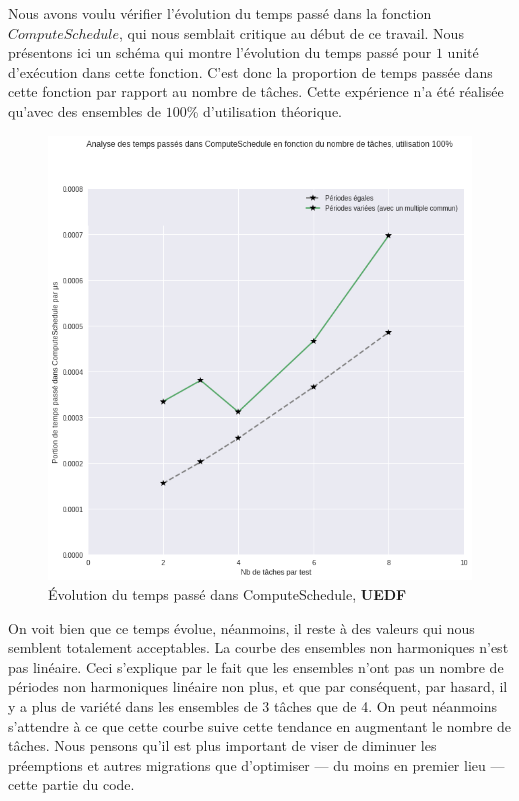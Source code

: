 	Nous avons voulu vérifier l'évolution du temps passé dans la fonction $ComputeSchedule$, qui nous semblait critique 
	au début de ce travail. Nous présentons ici un schéma qui montre 
	l'évolution du temps passé pour $1$ unité d'exécution dans cette fonction. C'est donc la 
	proportion de temps passée dans cette fonction par rapport au nombre de tâches. \newline
	Cette expérience n'a été réalisée qu'avec des ensembles de $100$\% d'utilisation théorique.

	\begin{figure}[H]
	\label{timeevolution}
		\caption{Évolution du temps passé dans ComputeSchedule, \textbf{UEDF}}
		\includegraphics[scale=0.5]{img/wcet/elapsedInCompueSchedule}
	\end{figure}		

	On voit bien que ce temps évolue, néanmoins, il reste à des valeurs qui nous semblent totalement acceptables.
	La courbe des ensembles non harmoniques n'est pas linéaire. Ceci s'explique par le fait 
	que les ensembles n'ont pas un nombre de périodes non harmoniques linéaire non plus, et que par conséquent, 
	par \og{}hasard\fg{}, il y a plus de variété dans les ensembles de $3$ tâches que de 4. On peut néanmoins s'attendre 
	à ce que cette courbe suive cette tendance en augmentant le nombre de tâches.
	Nous pensons qu'il est plus important de viser de diminuer les préemptions et autres migrations que 
	d'optimiser --- du moins en premier lieu --- cette partie du code.
	
